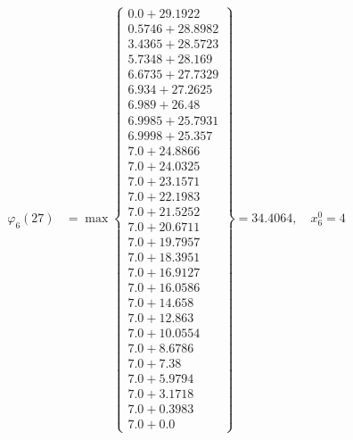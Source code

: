 \documentclass{article}
\begin{document}
\begin{align*}
  
\varphi_{6}(27) &= \max \left\{ \begin{array}{c}
0.0 + 29.1922 \\
 0.5746 + 28.8982 \\
 3.4365 + 28.5723 \\
 5.7348 + 28.169 \\
 6.6735 + 27.7329 \\
 6.934 + 27.2625 \\
 6.989 + 26.48 \\
 6.9985 + 25.7931 \\
 6.9998 + 25.357 \\
 7.0 + 24.8866 \\
 7.0 + 24.0325 \\
 7.0 + 23.1571 \\
 7.0 + 22.1983 \\
 7.0 + 21.5252 \\
 7.0 + 20.6711 \\
 7.0 + 19.7957 \\
 7.0 + 18.3951 \\
 7.0 + 16.9127 \\
 7.0 + 16.0586 \\
 7.0 + 14.658 \\
 7.0 + 12.863 \\
 7.0 + 10.0554 \\
 7.0 + 8.6786 \\
 7.0 + 7.38 \\
 7.0 + 5.9794 \\
 7.0 + 3.1718 \\
 7.0 + 0.3983 \\
 7.0 + 0.0
\end{array} \right\}=34.4064,\quad x_{6}^0=4\\
  
  
  

\end{align*}
\end{document}
